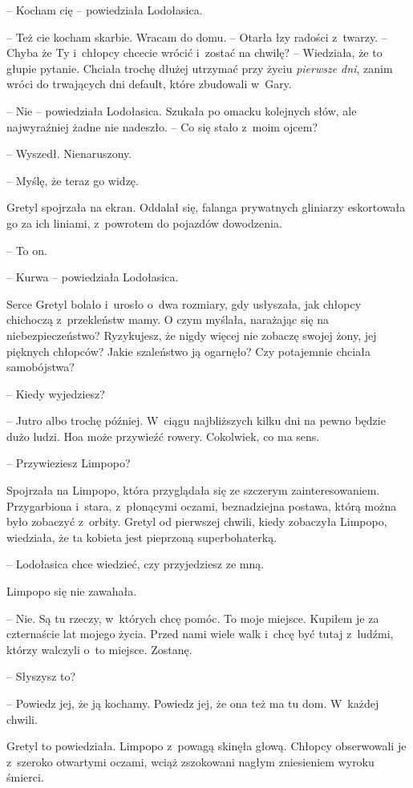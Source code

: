 \documentclass[oneside,polish,11pt,sfheadings]{mwbk}
\begin{document}
-- Kocham cię -- powiedziała Lodołasica.

-- Też cie kocham skarbie. Wracam do domu. -- Otarła łzy radości z~twarzy.
-- Chyba że Ty i~chłopcy chcecie wrócić i~zostać na chwilę? -- Wiedziała,
że to głupie pytanie. Chciała trochę dłużej utrzymać przy życiu
\textit{pierwsze dni}, zanim wróci do trwających dni default, które
zbudowali w~Gary.

-- Nie -- powiedziała Lodołasica. Szukała po omacku kolejnych słów, ale
najwyraźniej żadne nie nadeszło. -- Co się stało z~moim ojcem?

-- Wyszedł. Nienaruszony.

-- Myślę, że teraz go widzę.

Gretyl spojrzała na ekran. Oddalał się, falanga prywatnych gliniarzy
eskortowała go za ich liniami, z~powrotem do pojazdów dowodzenia. 

-- To on.

-- Kurwa -- powiedziała Lodołasica. 

Serce Gretyl bolało i~urosło o~dwa
rozmiary, gdy usłyszała, jak chłopcy chichoczą z~przekleństw mamy. O
czym myślała, narażając się na niebezpieczeństwo? Ryzykujesz, że nigdy
więcej nie zobaczę swojej żony, jej pięknych chłopców? Jakie szaleństwo
ją ogarnęło? Czy potajemnie chciała samobójstwa? 

-- Kiedy wyjedziesz?

-- Jutro albo trochę później. W~ciągu najbliższych kilku dni na pewno
będzie dużo ludzi. Hoa może przywieźć rowery. Cokolwiek, co ma sens.

-- Przywieziesz Limpopo?

Spojrzała na Limpopo, która przyglądała się ze szczerym
zainteresowaniem. Przygarbiona i~stara, z~płonącymi oczami, beznadziejna
postawa, którą można było zobaczyć z~orbity. Gretyl od pierwszej chwili,
kiedy zobaczyła Limpopo, wiedziała, że ta kobieta jest pieprzoną
superbohaterką.

-- Lodołasica chce wiedzieć, czy przyjedziesz ze mną.

Limpopo się nie zawahała. 

-- Nie. Są tu rzeczy, w~których chcę pomóc. To
moje miejsce. Kupiłem je za czternaście lat mojego życia. Przed nami
wiele walk i~chcę być tutaj z~ludźmi, którzy walczyli o~to miejsce.
Zostanę.

-- Słyszysz to?

-- Powiedz jej, że ją kochamy. Powiedz jej, że ona też ma tu dom. W~każdej chwili.

Gretyl to powiedziała. Limpopo z~powagą skinęła głową. Chłopcy
obserwowali je z~szeroko otwartymi oczami, wciąż zszokowani nagłym
zniesieniem wyroku śmierci.
\end{document}

